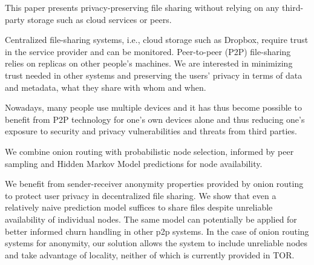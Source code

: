 
This paper presents privacy-preserving file sharing without relying on any third-party storage such as cloud services or peers. 

Centralized file-sharing systems, i.e.,  cloud storage such as Dropbox, require trust in the service provider and can be monitored. Peer-to-peer (P2P) file-sharing relies on replicas on other people's machines. We are interested in minimizing trust needed in other systems and preserving the users' privacy in terms of data and metadata, what they share with whom and when.

Nowadays, many people use multiple devices and it has thus become possible to benefit from P2P technology for one's own devices alone and thus reducing one's exposure to security and privacy vulnerabilities and threats from third parties.

We combine onion routing with probabilistic node selection, informed by peer sampling and Hidden Markov Model predictions for node availability.

We benefit from sender-receiver anonymity properties provided by onion routing to protect user privacy in decentralized file sharing. We show that even a relatively naive prediction model suffices to share files despite unreliable availability of individual nodes. The same model can potentially be applied for better informed churn handling in other p2p systems. In the case of onion routing systems for anonymity, our solution allows the system to include unreliable nodes and take advantage of locality, neither of which is currently provided in TOR.

